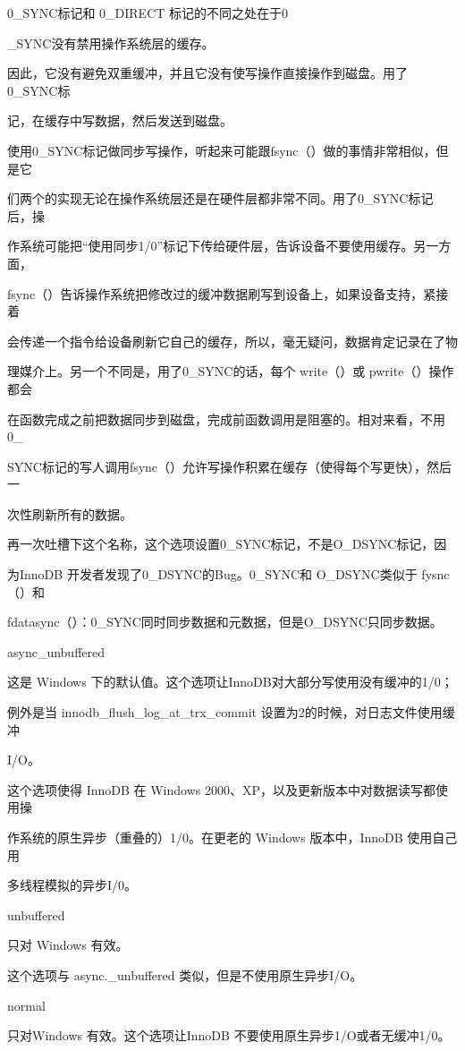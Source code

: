 0\_SYNC标记和 0\_DIRECT 标记的不同之处在于0

\_SYNC没有禁用操作系统层的缓存。

因此，它没有避免双重缓冲，并且它没有使写操作直接操作到磁盘。用了0\_SYNC标

记，在缓存中写数据，然后发送到磁盘。

使用0\_SYNC标记做同步写操作，听起来可能跟fsync（）做的事情非常相似，但是它

们两个的实现无论在操作系统层还是在硬件层都非常不同。用了0\_SYNC标记后，操

作系统可能把“使用同步1/0”标记下传给硬件层，告诉设备不要使用缓存。另一方面，

fsync（）告诉操作系统把修改过的缓冲数据刷写到设备上，如果设备支持，紧接着

会传递一个指令给设备刷新它自己的缓存，所以，毫无疑问，数据肯定记录在了物

理媒介上。另一个不同是，用了0\_SYNC的话，每个 write（）或 pwrite（）操作都会

在函数完成之前把数据同步到磁盘，完成前函数调用是阻塞的。相对来看，不用0\_

SYNC标记的写人调用fsync（）允许写操作积累在缓存（使得每个写更快），然后一

次性刷新所有的数据。

再一次吐槽下这个名称，这个选项设置0\_SYNC标记，不是O\_DSYNC标记，因

为InnoDB 开发者发现了0\_DSYNC的Bug。0\_SYNC和 O\_DSYNC类似于 fysnc（）和

fdatasync（）：0\_SYNC同时同步数据和元数据，但是O\_DSYNC只同步数据。

async\_unbuffered

这是 Windows 下的默认值。这个选项让InnoDB对大部分写使用没有缓冲的1/0；

例外是当 innodb\_flush\_log\_at\_trx\_commit 设置为2的时候，对日志文件使用缓冲

I/O。

这个选项使得 InnoDB 在 Windows 2000、XP，以及更新版本中对数据读写都使用操

作系统的原生异步（重叠的）1/0。在更老的 Windows 版本中，InnoDB 使用自己用

多线程模拟的异步I/0。

unbuffered

只对 Windows 有效。

这个选项与 async.\_unbuffered 类似，但是不使用原生异步I/O。

normal

只对Windows 有效。这个选项让InnoDB 不要使用原生异步1/O或者无缓冲1/0。

